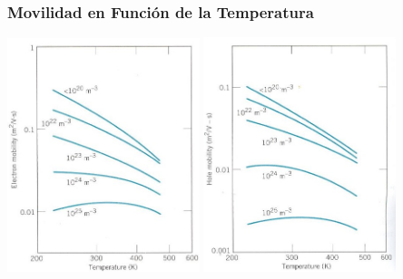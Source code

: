\documentclass[10pt,t,aspectratio=169]{beamer}
\begin{document}
\begin{frame}[t]
    \frametitle{Movilidad en Función de la Temperatura}

    \centering
    \includegraphics[width=5.6cm]{./figures/movilidad-vs-T-1.jpg}
    \includegraphics[width=5.6cm]{./figures/movilidad-vs-T-2.jpg}
\end{frame}
\end{document}
